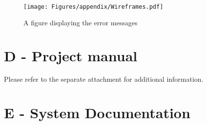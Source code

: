 \vspace{1cm}

\begin{figure}[!ht]
    \begin{minipage}{1\textwidth}
         \centering
      \texttt{[image: Figures/appendix/Wireframes.pdf]}
     \caption[Error message wireframes]{A figure displaying the error messages}\label{wireframes:errormessages}
    \end{minipage}\hfill
\end{figure}

\clearpage

\chapter*{D - Project manual}

Please refer to the separate attachment for additional information. \\

\chapter*{E - System Documentation}
\label{chap:system-documentation}

\renewcommand{\thefigure}{E.\arabic{figure}}
\setcounter{figure}{0}
\renewcommand{\thetable}{E.\arabic{table}}
\setcounter{table}{0}


